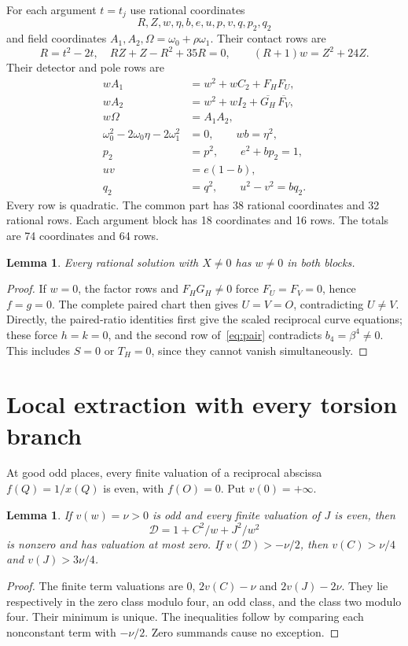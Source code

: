 \documentclass[11pt,a4paper]{article}
\newtheorem{lemma}[theorem]{Lemma}
\begin{document}
For each argument $t=t_j$ use rational coordinates
\[
        R,Z,w,\eta,b,e,u,p,v,q,p_2,q_2
\]
and field coordinates $A_1,A_2,\Omega=\omega_0+\rho\omega_1$.
Their contact rows are
\begin{equation}\label{eq:contactrows}
 R=t^2-2t,\quad RZ+Z-R^2+35R=0,\qquad
 (R+1)w=Z^2+24Z.
\end{equation}
Their detector and pole rows are
\begin{align}
 wA_1&=w^2+wC_2+F_HF_U,\label{eq:factor1}\\
 wA_2&=w^2+wI_2+\overline{G_H}\,\overline{F_V},\label{eq:factor2}\\
 w\Omega&=A_1A_2,\label{eq:product}\\
 \omega_0^2-2\omega_0\eta-2\omega_1^2&=0,
 \qquad wb=\eta^2,\label{eq:tracepole}\\
 p_2&=p^2,\qquad e^2+bp_2=1,\label{eq:pole1}\\
 uv&=e(1-b),\label{eq:pole2}\\
 q_2&=q^2,\qquad u^2-v^2=bq_2.\label{eq:pole3}
\end{align}
Every row is quadratic. The common part has 38 rational coordinates
and 32 rational rows. Each argument block has 18 coordinates and
16 rows. The totals are 74 coordinates and 64 rows.

\begin{lemma}\label{lem:nonzero}
Every rational solution with $X\ne0$ has $w\ne0$ in both blocks.
\end{lemma}
\begin{proof}
If $w=0$, the factor rows and $F_HG_H\ne0$ force
$F_U=F_V=0$, hence $f=g=0$. The complete paired chart then gives
$U=V=O$, contradicting $U\ne V$. Directly, the paired-ratio
identities first give the scaled reciprocal curve equations; these
force $h=k=0$, and the second row of~\eqref{eq:pair} contradicts
$b_4=\beta^4\ne0$. This includes $S=0$ or $T_H=0$, since they
cannot vanish simultaneously.
\end{proof}

\section{Local extraction with every torsion branch}
At good odd places, every finite valuation of a reciprocal abscissa
$f(Q)=1/x(Q)$ is even, with $f(O)=0$. Put $v(0)=+\infty$.

\begin{lemma}\label{lem:factor}
If $v(w)=\nu>0$ is odd and every finite valuation of $J$ is even,
then
\[
                  \mathcal D=1+C^2/w+J^2/w^2
\]
is nonzero and has valuation at most zero. If
$v(\mathcal D)>-\nu/2$, then $v(C)>\nu/4$ and
$v(J)>3\nu/4$.
\end{lemma}
\begin{proof}
The finite term valuations are $0$, $2v(C)-\nu$ and
$2v(J)-2\nu$. They lie respectively in the zero class modulo four,
an odd class, and the class two modulo four. Their minimum is unique.
The inequalities follow by comparing each nonconstant term with
$-\nu/2$. Zero summands cause no exception.
\end{proof}
\end{document}
